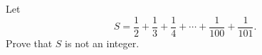 Let
\[
S=\dfrac{1}{2}+\dfrac{1}{3}+\dfrac{1}{4}+\cdots+\dfrac{1}{100}+\dfrac{1}{101}.
\]
Prove that $S$ is not an integer.
